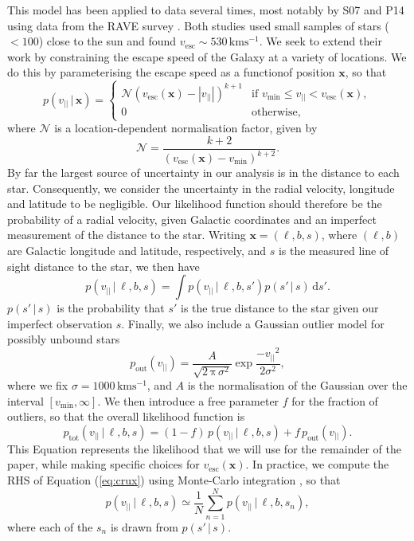 \documentclass[useAMS,twocolumn,usenatbib]{mn2e}
\def\kms{{\,\mathrm{kms^{-1}}}}
\def\vlos{{v_{||}}}
\def\vesc{{v_\mathrm{esc}}}
\def\vmin{{v_\mathrm{min}}}
\def\pos{{\boldsymbol{x}}}
\def\intd{{\mathrm{d}}}
\begin{document}
This model has been applied to data several times, most notably by S07 and P14 using data from the {\sc RAVE} survey \citep{Ko13}. 
Both studies used small samples of stars ($<100$) close to the sun and found $\vesc \sim 530\kms$. 
We seek to extend their work by constraining the escape speed of the Galaxy at a variety of locations. 
We do this by parameterising the escape speed as a functionof position $\pos$, so that
%
\begin{equation}
  p(\vlos \,|\, \pos) = \begin{cases}
    \mathcal{N}(\vesc(\pos) - |\vlos|)^{k+1} & \text{if $\vmin \leq \vlos <\vesc(\pos)$},\\
    0 & \text{otherwise},
  \end{cases}
  \label{eq:model}
\end{equation}
%
where $\mathcal{N}$ is a location-dependent normalisation factor, given by
%
\begin{equation}
\mathcal{N} = \dfrac{k+2}{(\vesc(\pos) - \vmin)^{k+2}}.
\label{eq:norm}
\end{equation}
%
By far the largest source of uncertainty in our analysis is in the distance to each star. 
Consequently, we consider the uncertainty in the radial velocity, longitude and latitude to be negligible. 
Our likelihood function should therefore be the probability of a radial velocity, given Galactic coordinates and an imperfect measurement of the distance to the star. 
Writing $\pos = (\ell, b, s)$, where $(\ell,b)$ are Galactic longitude and latitude, respectively, and $s$ is the measured line of sight distance to the star, we then have
%
\begin{equation}
p(\vlos \,|\, \ell, b, s) = \int p(\vlos \,| \,\ell, b, s' )p(s'\,|\,s)\, \intd s'.
\label{eq:crux}
\end{equation}
%
$p(s'\,|\,s)$ is the probability that $s'$ is the true distance to the star given our imperfect observation $s$. 
Finally, we also include a Gaussian outlier model for possibly unbound stars
%
\begin{equation}
p_\mathrm{out}(\vlos) = \dfrac{A}{\sqrt{2\,\mathrm{\pi}\,\sigma^2}}\exp \dfrac{-\vlos^2}{2\sigma^2},
\end{equation}
%
where we fix $\sigma = 1000\kms$, and $A$ is the normalisation of the Gaussian over the interval $\left[v_\mathrm{min},\infty\right]$. 
We then introduce a free parameter $f$ for the fraction of outliers, so that the overall likelihood function is
%
\begin{equation}
p_\mathrm{tot}(\vlos \,|\, \ell, b, s) = (1-f)\,p(\vlos \,|\, \ell, b, s) + f\,p_\mathrm{out}(\vlos).
\end{equation}
%
This Equation represents the likelihood that we will use for the remainder of the paper, while making specific choices for $\vesc(\pos)$. 
In practice, we compute the RHS of Equation (\ref{eq:crux}) using Monte-Carlo integration \citep[e.g.][]{Ev16,Bo16}, so that
%
\begin{equation}
p(\vlos \,|\, \ell, b, s) \simeq \dfrac{1}{N}\sum\limits_{n=1}^{N} p(\vlos \,| \,\ell, b, s_n ),
\end{equation}
%
where each of the $s_n$ is drawn from $p(s'\,|\,s)$.
\end{document}
